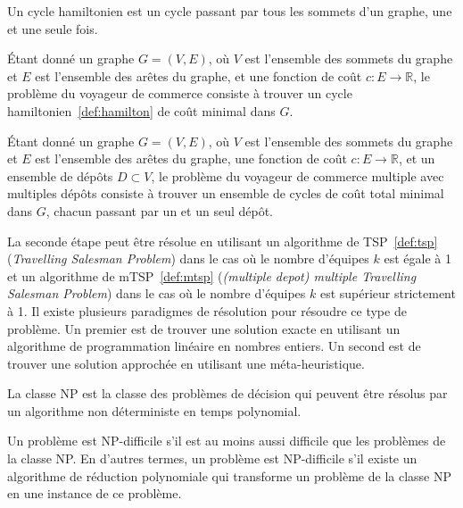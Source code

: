 \documentclass[english,RandD]{rapportPFE}  %
\begin{document}
				\begin{Definition}
					\label{def:hamilton}
					Un cycle hamiltonien est un cycle passant par tous les sommets d'un graphe, une et une seule fois.
				\end{Definition}

				\begin{Definition}
					\label{def:tsp}
					Étant donné un graphe $G = (V, E)$, où $V$ est l'ensemble des sommets du graphe et $E$ est l'ensemble des arêtes du graphe, et une fonction de coût $c : E \rightarrow \mathbb{R}$, le problème du voyageur de commerce consiste à trouver un cycle hamiltonien~\ref{def:hamilton} de coût minimal dans $G$.
				\end{Definition}

				\begin{Definition}
					\label{def:mtsp}
					Étant donné un graphe $G = (V, E)$, où $V$ est l'ensemble des sommets du graphe et $E$ est l'ensemble des arêtes du graphe, une fonction de coût $c : E \rightarrow \mathbb{R}$, et un ensemble de dépôts $D \subset V$, le problème du voyageur de commerce multiple avec multiples dépôts consiste à trouver un ensemble de cycles de coût total minimal dans $G$, chacun passant par un et un seul dépôt.
				\end{Definition}

				La seconde étape peut être résolue en utilisant un algorithme de TSP~\ref{def:tsp} (\textit{Travelling Salesman Problem}) dans le cas où le nombre d'équipes $k$ est égale à 1 et un algorithme de mTSP~\ref{def:mtsp} (\textit{(multiple depot) multiple Travelling Salesman Problem}) dans le cas où le nombre d'équipes $k$ est supérieur strictement à 1.
				Il existe plusieurs paradigmes de résolution pour résoudre ce type de problème.
				Un premier est de trouver une solution exacte en utilisant un algorithme de programmation linéaire en nombres entiers.
				Un second est de trouver une solution approchée en utilisant une méta-heuristique.

				\begin{Definition}[Classe NP]
					\label{def:np}
					La classe NP est la classe des problèmes de décision qui peuvent être résolus par un algorithme non déterministe en temps polynomial.
				\end{Definition}

				\begin{Definition}
					\label{def:nph}
					Un problème est NP-difficile s'il est au moins aussi difficile que les problèmes de la classe NP.
					En d'autres termes, un problème est NP-difficile s'il existe un algorithme de réduction polynomiale qui transforme un problème de la classe NP en une instance de ce problème.
				\end{Definition}
\end{document}
